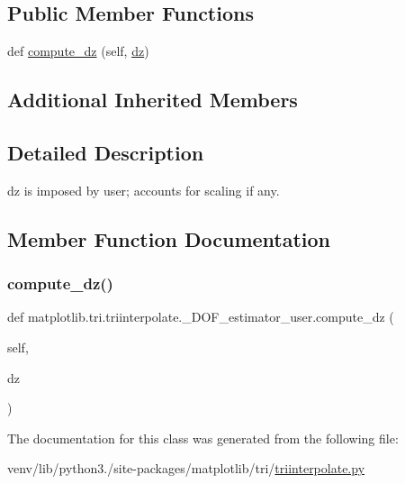 \subsection*{Public Member Functions}
\begin{DoxyCompactItemize}
\item 
def \hyperlink{classmatplotlib_1_1tri_1_1triinterpolate_1_1__DOF__estimator__user_addb2ea0e1a71e1954f4a4fef81d7b624}{compute\+\_\+dz} (self, \hyperlink{classmatplotlib_1_1tri_1_1triinterpolate_1_1__DOF__estimator_a6ef7582c428debb80338362626b24ce7}{dz})
\end{DoxyCompactItemize}
\subsection*{Additional Inherited Members}


\subsection{Detailed Description}
\begin{DoxyVerb}dz is imposed by user; accounts for scaling if any.\end{DoxyVerb}
 

\subsection{Member Function Documentation}
\mbox{\label{classmatplotlib_1_1tri_1_1triinterpolate_1_1__DOF__estimator__user_addb2ea0e1a71e1954f4a4fef81d7b624}} 
\subsubsection{\texorpdfstring{compute\+\_\+dz()}{compute\_dz()}}
{\footnotesize\ttfamily def matplotlib.\+tri.\+triinterpolate.\+\_\+\+D\+O\+F\+\_\+estimator\+\_\+user.\+compute\+\_\+dz (\begin{DoxyParamCaption}\item[{}]{self,  }\item[{}]{dz }\end{DoxyParamCaption})}



The documentation for this class was generated from the following file\+:\begin{DoxyCompactItemize}
\item 
venv/lib/python3./site-\/packages/matplotlib/tri/\hyperlink{triinterpolate_8py}{triinterpolate.\+py}\end{DoxyCompactItemize}
